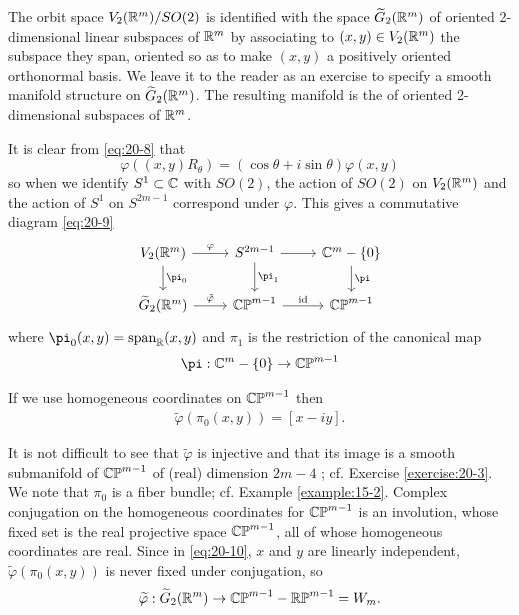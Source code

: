The orbit space $V_2({\mathbb{R}}^m)/{SO}(2)$ is identified with the space $\widetilde{G}_2({\mathbb{R}}^m)$ 
of oriented 2-dimensional linear subspaces of ${{\mathbb{R}}^m}$ by associating to $( {x,y})  \in  {V}_{2}( {{\mathbb{R}}^m})$ 
the subspace they span, oriented so as to make $(x, y)$ a positively oriented orthonormal basis. We leave it to the 
reader as an exercise to specify a smooth manifold structure on $\widetilde{G}_{2}( {{\mathbb{R}}^m})$. The resulting 
manifold is the  of oriented 2-dimensional subspaces of ${\mathbb{R}}^m$.

It is clear from \eqref{eq:20-8} that
\[
  \varphi ( {( {x,y}) {R}_{\theta }})  
  = ( {\cos \theta  + i\sin \theta }) \varphi ( {x,y})
\]
so when we identify ${S}^{1} \subset  \mathbb{C}$ with ${SO}( 2)$, the action of ${SO}( 2)$ on ${V}_{2}( {{\mathbb{R}}^m})$ 
and the action of ${S}^{1}$ on ${S}^{{2m}- 1}$ correspond under $\varphi$. This gives a commutative diagram \eqref{eq:20-9}
\begin{equation}\label{eq:20-9}
  \begin{tikzcd}
    V_2(\RR^m)\dar{\pi_0}\rar{\varphi} & S^{2m-1}\dar{\pi_1}\rar{} & \CC^m-\{0\}\dar{\pi}\\
    \widetilde{G}_2(\RR^m)\rar{\tilde{\varphi}} & \CP^{m-1}\rar{\text{id}} & \CP^{m-1}
  \end{tikzcd}
\end{equation}
where ${\pi }_{0}( {x,y})  = {\R{span}}_{\RR}( {x,y})$ and ${\pi }_{1}$ is the restriction of 
the canonical map
\[
  \pi: {\B{C}}^{m}- \{ 0\}  \ra  {\CP}^{m- 1}
\]

If we use homogeneous coordinates on ${\mathbb{CP}}^{m- 1}$ then
\begin{align}\label{eq:20-10}
  \widetilde{\varphi }( {{\pi }_{0}( {x,y}) })  = [  {x- {iy}}].
\end{align}

It is not difficult to see that $\widetilde{\varphi }$ is injective and that its image is a smooth 
submanifold of ${\mathbb{CP}}^{m- 1}$ of (real) dimension ${2m}- 4$ ; cf. Exercise \ref{exercise:20-3}. We note that ${\pi }_{0}$ 
is a fiber bundle; cf. Example \ref{example:15-2}. Complex conjugation on the homogeneous coordinates for ${\mathbb{CP}}^{m-1}$ 
is an involution, whose fixed set is the real projective space ${\mathbb{CP}}^{m- 1}$, all of whose homogeneous 
coordinates are real. Since in \eqref{eq:20-10}, $x$ and $y$ are linearly independent, $\widetilde{\varphi }( {{\pi }_{0}( {x,y}) })$ 
is never fixed under conjugation, so
\begin{align}\label{eq:20-11}
  \widetilde{\varphi } : \widetilde{G}_{2}( {{\mathbb{R}}^m})  \rightarrow  {\mathbb{CP}}^{m- 1}- \mathbb{RP}^{m- 1} = {W}_{m}.
\end{align}

